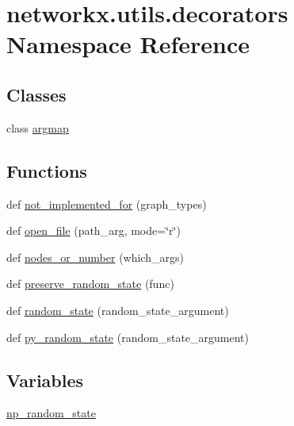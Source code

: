 \hypertarget{namespacenetworkx_1_1utils_1_1decorators}{}\section{networkx.\+utils.\+decorators Namespace Reference}
\label{namespacenetworkx_1_1utils_1_1decorators}
\subsection*{Classes}
\begin{DoxyCompactItemize}
\item 
class \hyperlink{classnetworkx_1_1utils_1_1decorators_1_1argmap}{argmap}
\end{DoxyCompactItemize}
\subsection*{Functions}
\begin{DoxyCompactItemize}
\item 
def \hyperlink{namespacenetworkx_1_1utils_1_1decorators_a0ed95ec8bd617750c9c86fabeb605dc3}{not\+\_\+implemented\+\_\+for} (graph\+\_\+types)
\item 
def \hyperlink{namespacenetworkx_1_1utils_1_1decorators_a18d22de0af3b4116edf4d1b4c6facfed}{open\+\_\+file} (path\+\_\+arg, mode=\char`\"{}r\char`\"{})
\item 
def \hyperlink{namespacenetworkx_1_1utils_1_1decorators_a70c253fe8c06d4036b428fd9f9e176ca}{nodes\+\_\+or\+\_\+number} (which\+\_\+args)
\item 
def \hyperlink{namespacenetworkx_1_1utils_1_1decorators_abea11d7fda9dda374bd6930d5a0cb65e}{preserve\+\_\+random\+\_\+state} (func)
\item 
def \hyperlink{namespacenetworkx_1_1utils_1_1decorators_aac9c86a445c407bb96ac3a7103a62a07}{random\+\_\+state} (random\+\_\+state\+\_\+argument)
\item 
def \hyperlink{namespacenetworkx_1_1utils_1_1decorators_a5168d850b80d4a80eb9423720bf3be7d}{py\+\_\+random\+\_\+state} (random\+\_\+state\+\_\+argument)
\end{DoxyCompactItemize}
\subsection*{Variables}
\begin{DoxyCompactItemize}
\item 
\hyperlink{namespacenetworkx_1_1utils_1_1decorators_a2878a448026ebcbeda1f29e7f3506cd5}{np\+\_\+random\+\_\+state}
\end{DoxyCompactItemize}


